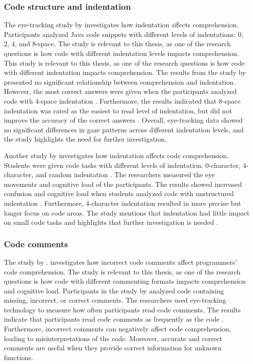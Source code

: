 \subsubsection{Code structure and indentation} 


The eye-tracking study by \citet{bauer2017indentations} investigates how indentation affects comprehension. Participants analyzed Java code snippets with different levels of indentations: 0, 2, 4, and 8-space. The study is relevant to this thesis, as one of the research questions is how code with different  indentation levels impacts comprehension. This study is relevant to this thesis, as one of the research questions is how code with different indentation impacts comprehension. The results from the study by \citet{bauer2017indentations} presented no significant relationship between comprehension and indentation. However, the most correct answers were given when the participants analyzed code with 4-space indentation . Furthermore, the results indicated that 8-space indentation was rated as the easiest to read level of indentation, but did not improve the accuracy of the correct answers \cite{bauer2017indentations}. Overall, eye-tracking data showed no significant differences in gaze patterns across different indentation levels, and the study highlights the need for further investigation. 



Another study by \citet{yorimoto2024quantitative} investigates how indentation affects code comprehension. Students were given code tasks with different levels of indentation: 0-character, 4-character, and random indentation \cite{yorimoto2024quantitative}. The researchers measured the eye movements and cognitive load of the participants. The results showed increased confusion and cognitive load when students analyzed code with unstructured indentation \cite{yorimoto2024quantitative}. Furthermore, 4-character indentation resulted in more precise but longer focus on code areas. The study mentions that indentation had little impact on small code tasks and highlights that further investigation is needed \cite{yorimoto2024quantitative}.  

\subsubsection{Code comments} 

The study by  \citet{bakhuizen2019comments}. investigates how incorrect code comments affect programmers' code comprehension. The study is relevant to this thesis, as one of the research questions is how code with different  commenting formats impacts comprehension and cognitive load.  Participants in the study by  \citet{bakhuizen2019comments} analyzed code containing missing, incorrect, or correct comments.
The researchers used eye-tracking technology to measure how often participants read code comments. The results indicate that participants read code comments as frequently as the code \cite{bakhuizen2019comments}. Furthermore, incorrect comments can negatively affect code comprehension, leading to misinterpretations of the code. Moreover, accurate and correct comments are useful when they provide correct information for unknown functions. 

